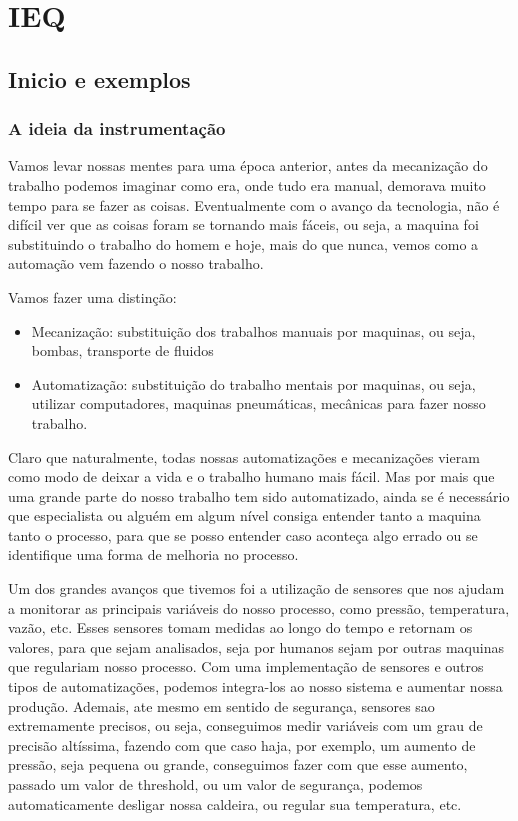 \chapter{IEQ}
\section{Inicio e exemplos}
\subsection{A ideia da instrumentação}
Vamos levar nossas mentes para uma época anterior, antes da mecanização do trabalho podemos imaginar
como era, onde tudo era manual, demorava muito tempo para se fazer as coisas. Eventualmente com o
avanço da tecnologia, não é difícil ver que as coisas foram se tornando mais fáceis, ou seja, a
maquina foi substituindo o trabalho do homem e hoje, mais do que nunca, vemos como a automação vem
fazendo o nosso trabalho.\par

Vamos fazer uma distinção:
\begin{itemize}
    \item Mecanização: substituição dos trabalhos manuais por maquinas, ou seja, bombas, transporte
    de fluidos
    \item Automatização: substituição do trabalho mentais por maquinas, ou seja, utilizar
    computadores, maquinas pneumáticas, mecânicas para fazer nosso trabalho.
\end{itemize}
Claro que naturalmente, todas nossas automatizações e mecanizações vieram como modo de deixar a vida
e o trabalho humano mais fácil. Mas por mais que uma grande parte do nosso trabalho tem sido
automatizado, ainda se é necessário que especialista ou alguém em algum nível consiga entender
tanto a maquina tanto o processo, para que se posso entender caso aconteça algo errado ou se
identifique uma forma de melhoria no processo. \par

Um dos grandes avanços que tivemos foi a utilização de sensores que nos ajudam a monitorar as
principais variáveis do nosso processo, como pressão, temperatura, vazão, etc. Esses sensores tomam
medidas ao longo do tempo e retornam os valores, para que sejam analisados, seja por humanos sejam
por outras maquinas que regulariam nosso processo. Com uma implementação de sensores e outros tipos
de automatizações, podemos integra-los ao nosso sistema e aumentar nossa produção. Ademais, ate
mesmo em sentido de segurança, sensores sao extremamente precisos, ou seja, conseguimos medir
variáveis com um grau de precisão altíssima, fazendo com que caso haja, por exemplo, um aumento de
pressão, seja pequena ou grande, conseguimos fazer com que esse aumento, passado um valor de
threshold, ou um valor de segurança, podemos automaticamente desligar nossa caldeira, ou regular sua
temperatura, etc. \par


